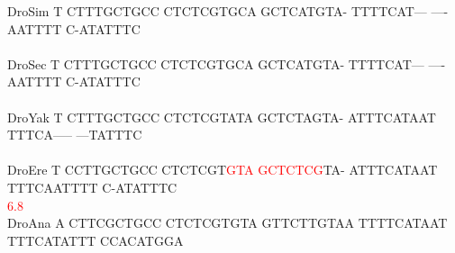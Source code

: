 \documentclass[11pt,twoside,reqno,a4paper]{article}
\begin{document}
{DroSim	T	CTTTGCTGCC	CTCTCGTGCA	GCTCATGTA-	TTTTCAT---	----AATTTT	C-ATATTTC\\
\hspace*{7\charwidth}\hspace*{1\charwidth}\hspace*{1\charwidth}\hspace*{1\charwidth}\hspace*{1\charwidth}\hspace*{1\charwidth}\hspace*{1\charwidth}\\
DroSec	T	CTTTGCTGCC	CTCTCGTGCA	GCTCATGTA-	TTTTCAT---	----AATTTT	C-ATATTTC\\
\hspace*{7\charwidth}\hspace*{1\charwidth}\hspace*{1\charwidth}\hspace*{1\charwidth}\hspace*{1\charwidth}\hspace*{1\charwidth}\hspace*{1\charwidth}\\
DroYak	T	CTTTGCTGCC	CTCTCGTATA	GCTCTAGTA-	ATTTCATAAT	TTTCA-----	---TATTTC\\
\hspace*{7\charwidth}\hspace*{1\charwidth}\hspace*{1\charwidth}\hspace*{1\charwidth}\hspace*{1\charwidth}\hspace*{1\charwidth}\hspace*{1\charwidth}\\
DroEre	T	CCTTGCTGCC	CTCTCGT\textcolor{Red}{G}\textcolor{Red}{T}\textcolor{Red}{A}	\textcolor{Red}{G}\textcolor{Red}{C}\textcolor{Red}{T}\textcolor{Red}{C}\textcolor{Red}{T}\textcolor{Red}{C}\textcolor{Red}{G}TA-	ATTTCATAAT	TTTCAATTTT	C-ATATTTC\\
\hspace*{7\charwidth}\hspace*{1\charwidth}\hspace*{1\charwidth}\hspace*{18\charwidth}\textcolor{Red}{6.8}\hspace*{1\charwidth}\hspace*{1\charwidth}\hspace*{1\charwidth}\hspace*{1\charwidth}\\
DroAna	A	CTTCGCTGCC	CTCTCGTGTA	GTTCTTGTAA	TTTTCATAAT	TTTCATATTT	CCACATGGA\\
}
\end{document}
